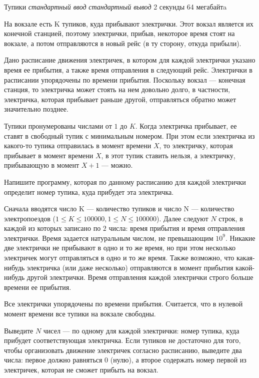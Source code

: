 \begin{problem}%
{Тупики}%
{\textsl{стандартный ввод}}%
{\textsl{стандартный вывод}}%
{2 секунды}%
{64 мегабайтa}{}

На вокзале есть K тупиков, куда прибывают электрички. Этот вокзал является их конечной станцией, поэтому электрички, прибыв, некоторое время стоят на вокзале, а потом отправляются в новый рейс (в ту сторону, откуда прибыли).

Дано расписание движения электричек, в котором для каждой электрички указано время ее прибытия, а также время отправления в следующий рейс. Электрички в расписании упорядочены по времени прибытия. Поскольку вокзал — конечная станция, то электричка может стоять на нем довольно долго, в частности, электричка, которая прибывает раньше другой, отправляться обратно может значительно позднее.

Тупики пронумерованы числами от $1$ до $K$. Когда электричка прибывает, ее ставят в свободный тупик с минимальным номером. При этом если электричка из какого-то тупика отправилась в момент времени $X$, то электричку, которая прибывает в момент времени $X$, в этот тупик ставить нельзя, а электричку, прибывающую в момент $X+1$ — можно.

Напишите программу, которая по данному расписанию для каждой электрички определит номер тупика, куда прибудет эта электричка.

\InputFile

Сначала вводятся число K — количество тупиков и число N — количество электропоездов ($1 \le K \le 100000, 1 \le N \le 100000$). Далее следуют $N$ строк, в каждой из которых записано по $2$ числа: время прибытия и время отправления электрички. Время задается натуральным числом, не превышающим $10^9$. Никакие две электрички не прибывают в одно и то же время, но при этом несколько электричек могут отправляться в одно и то же время. Также возможно, что какая-нибудь электричка (или даже несколько) отправляются в момент прибытия какой-нибудь другой электрички. Время отправления каждой электрички строго больше времени ее прибытия.

Все электрички упорядочены по времени прибытия. Считается, что в нулевой момент времени все тупики на вокзале свободны.  

\OutputFile

Выведите $N$ чисел — по одному для каждой электрички: номер тупика, куда прибудет соответствующая электричка. Если тупиков не достаточно для того, чтобы организовать движение электричек согласно расписанию,  выведите два числа: первое должно равняться $0$ (нулю), а второе содержать номер первой из электричек, которая не сможет прибыть на вокзал.

\Examples

\begin{example}
%
%
%
\end{example}
\end{problem}
